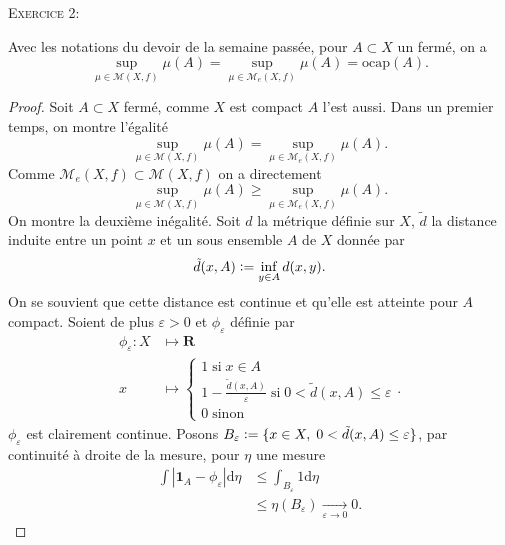 \documentclass[12pt]{article}
\newcommand{\defeq}{\vcentcolon=}
\newenvironment{ex}[1]
{\begin{mdframed}[linewidth=0.6pt]
        \textsc{Exercice #1:}

}
    {\end{mdframed}}
\newcommand{\R}{\mathbf{R}}
\newcommand{\de}{\mathrm{d}}
\begin{document}
\begin{ex}{2}
        Avec les notations du devoir de la semaine passée, pour $A \subset X$ un fermé, on a \[
                \sup_{\mu \in \mathcal{M}(X,f)}\mu(A) = \sup_{\mu \in \mathcal{M}_{e}(X,f)}\mu(A) = \mathrm{ocap}(A)
        .\] 
\end{ex}
\begin{proof}
        Soit $A \subset X$ fermé, comme $X$ est compact $A$ l'est aussi. Dans un premier temps, on montre l'égalité \[
        \sup_{\mu \in \mathcal{M}(X,f)}\mu(A) = \sup_{\mu \in \mathcal{M}_{e}(X,f)}\mu(A) 
.\] Comme $\mathcal{M}_{e}(X,f) \subset \mathcal{M}(X,f)$ on a directement \[
\sup_{\mu \in \mathcal{M}(X,f)}\mu(A) \ge \sup_{\mu \in \mathcal{M}_{e}(X,f)}\mu(A) 
.\]  On montre la deuxième inégalité. Soit $d$ la métrique définie sur $X$, $\tilde{d}$ la distance induite entre un point $x$ et un sous ensemble $A$ de $X$ donnée par  \[
\tilde{d}(x,A) \defeq \inf_{y \in A}d(x,y)
.\] On se souvient que cette distance est continue et qu'elle est atteinte pour $A$ compact. Soient de plus $\varepsilon > 0$ et $\phi_{\varepsilon}$ définie par 
\begin{align*}
        \phi_{\varepsilon} : X &\longmapsto \R \\
        x &\longmapsto \begin{cases}
                1 \; \text{si} \; x \in A \\
                1 - \frac{\tilde{d}(x, A)}{\varepsilon} \; \text{si} \; 0 < \tilde{d}(x, A) \le \varepsilon \\
                0 \; \text{sinon}
        \end{cases}
.\end{align*}
$\phi_{\varepsilon}$ est clairement continue. Posons $B_{\varepsilon} \defeq \{x \in X, \; 0 < \tilde{d}(x,A) \le \varepsilon\}$, par continuité à droite de la mesure, pour $\eta$ une mesure
\begin{align*}
        \int |\mathbf{1}_{A}-\phi_{\varepsilon}|\de \eta &\le \int_{B_{\varepsilon}} 1\de \eta \\
                 &\le \eta(B_{\varepsilon}) \underset{\varepsilon \to 0}{\to} 0
.\end{align*}


\end{proof}
\end{document}
